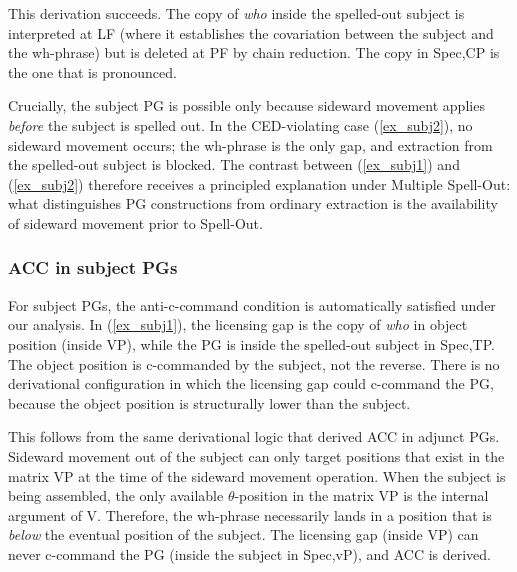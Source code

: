 \documentclass[12pt]{article}
\begin{document}
\noindent
This derivation succeeds. The copy of \textit{who} inside the spelled-out subject is interpreted at LF (where it establishes the covariation between the subject and the wh-phrase) but is deleted at PF by chain reduction. The copy in Spec,CP is the one that is pronounced.

Crucially, the subject PG is possible only because sideward movement applies \textit{before} the subject is spelled out. In the CED-violating case (\ref{ex_subj2}), no sideward movement occurs; the wh-phrase is the only gap, and extraction from the spelled-out subject is blocked. The contrast between (\ref{ex_subj1}) and (\ref{ex_subj2}) therefore receives a principled explanation under Multiple Spell-Out: what distinguishes PG constructions from ordinary extraction is the availability of sideward movement prior to Spell-Out.

\subsubsection{ACC in subject PGs}

For subject PGs, the anti-c-command condition is automatically satisfied under our analysis. In (\ref{ex_subj1}), the licensing gap is the copy of \textit{who} in object position (inside VP), while the PG is inside the spelled-out subject in Spec,TP. The object position is c-commanded by the subject, not the reverse. There is no derivational configuration in which the licensing gap could c-command the PG, because the object position is structurally lower than the subject.

This follows from the same derivational logic that derived ACC in adjunct PGs. Sideward movement out of the subject can only target positions that exist in the matrix VP at the time of the sideward movement operation. When the subject is being assembled, the only available $\theta$-position in the matrix VP is the internal argument of V. Therefore, the wh-phrase necessarily lands in a position that is \textit{below} the eventual position of the subject. The licensing gap (inside VP) can never c-command the PG (inside the subject in Spec,vP), and ACC is derived.
\end{document}
